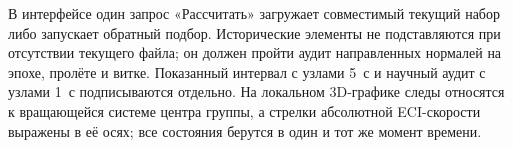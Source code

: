 \documentclass[a4paper,12pt]{article}
\begin{document}
В интерфейсе один запрос «Рассчитать» загружает совместимый текущий
набор либо запускает обратный подбор. Исторические элементы не
подставляются при отсутствии текущего файла; он должен пройти аудит
направленных нормалей на эпохе, пролёте и витке. Показанный интервал
с узлами 5~с и научный аудит с узлами 1~с подписываются отдельно.
На локальном 3D-графике следы относятся к вращающейся системе центра
группы, а стрелки абсолютной ECI-скорости выражены в её осях;
все состояния берутся в один и тот же момент времени.
\end{document}
